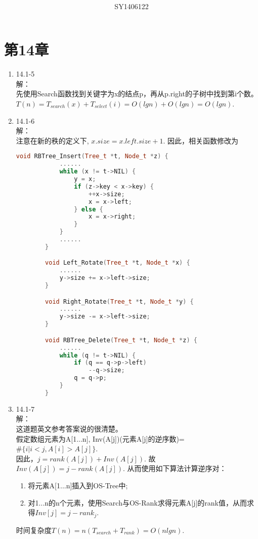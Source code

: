 \documentclass[UTF8]{ctexart}
\begin{document}
\title{\\}
\vspace{2cm}
\author{\\SY1406122}
\date{}
\maketitle

\section*{第14章}
\begin{enumerate}
    \item 14.1-5 \\
    解：\\
        先使用Search函数找到关键字为x的结点p，再从p.right的子树中找到第i个数。\\
		$T(n) = T_{search}(x) + T_{select}(i) = O(lgn) + O(lgn) = O(lgn)$.
		
	
	\item 14.1-6 \\
	解：\\
		注意在新的秩的定义下, $x.size = x.left.size + 1$. 因此，相关函数修改为\\
	\begin{lstlisting}[language=C++]
		void RBTree_Insert(Tree_t *t, Node_t *z) {
			......
			while (x != t->NIL) {
				y = x;
				if (z->key < x->key) {
					++x->size;
					x = x->left;
				} else {
					x = x->right;
				}
			}
			......
		}

		void Left_Rotate(Tree_t *t, Node_t *x) {
			......
			y->size += x->left->size;
		}

		void Right_Rotate(Tree_t *t, Node_t *y) {
			......
			y->size -= x->left->size;
		}

		void RBTree_Delete(Tree_t *t, Node_t *z) {
			......
			while (q != t->NIL) {
				if (q == q->p->left)
					--q->size;
				q = q->p;
			}
		}
	\end{lstlisting}
	
	\item 14.1-7 \\
	解：\\
		这道题英文参考答案说的很清楚。\\
		假定数组元素为A[1...n], 
		Inv(A[j])(元素A[j]的逆序数)=$\#\{i|i<j, A[i]>A[j]\}$. \\
		因此，$j = rank(A[j]) + Inv(A[j])$. 
		故$Inv(A[j]) = j - rank(A[j])$. 从而使用如下算法计算逆序对：
		\begin{enumerate}[(1)]
			\item 将元素A[1...n]插入到OS-Tree中;
			\item 对1...n的n个元素，使用Search与OS-Rank求得元素A[j]的rank值，从而求得$Inv[j] = j - rank_j$.
		\end{enumerate}
		时间复杂度$T(n) = n(T_{search} + T_{rank}) = O(nlgn)$.
		
	
\end{enumerate}
\end{document}
